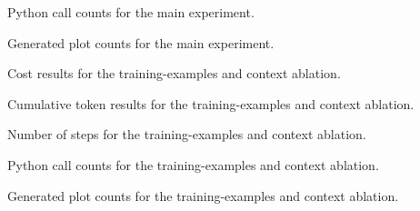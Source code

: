 \begin{table}[ht]
\centering
\caption{Python call counts for the main experiment.}
\label{tab:app-python-calls-main-experiment-table}

\end{table}

\begin{table}[ht]
\centering
\caption{Generated plot counts for the main experiment.}
\label{tab:app-plots-generated-main-experiment-table}

\end{table}

\begin{table}[ht]
\centering
\caption{Cost results for the training-examples and context ablation.}
\label{tab:app-cost-ablation-training-examples}

\end{table}

\begin{table}[ht]
\centering
\caption{Cumulative token results for the training-examples and context ablation.}
\label{tab:app-cum-ablation-training-examples}

\end{table}

\begin{table}[ht]
\centering
\caption{Number of steps for the training-examples and context ablation.}
\label{tab:app-num-steps-ablation-training-examples}

\end{table}

\begin{table}[ht]
\centering
\caption{Python call counts for the training-examples and context ablation.}
\label{tab:app-python-calls-ablation-training-examples}

\end{table}

\begin{table}[ht]
\centering
\caption{Generated plot counts for the training-examples and context ablation.}
\label{tab:app-plots-generated-ablation-training-examples}

\end{table}
